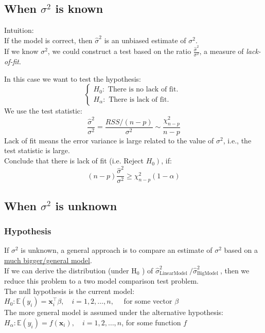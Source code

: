 \documentclass[11pt,a4paper]{article}
\begin{document}
\subsection{When $\sigma^2$ is known}
Intuition:\\
If the model is correct, then $\hat{\sigma}^2$ is an unbiased estimate of $\sigma^2$.\\
If we know $\sigma^2$, we could construct a test based on the ratio $\frac{\hat{\sigma}^2}{\sigma^2}$, a measure of \textit{lack-of-ﬁt}.

In this case we want to test the hypothesis:
$$
\left\{\begin{array}{l}
H_{0}: \text { There is no lack of fit. } \\
H_{\alpha}: \text { There is lack of fit. }
\end{array}\right.
$$
We use the test statistic:
$$
\frac{\hat{\sigma}^{2}}{\sigma^{2}}=\frac{R S S /(n-p)}{\sigma^{2}} \sim \frac{\chi_{n-p}^{2}}{n-p}
$$
Lack of fit means the error variance is large related to the value of $\sigma^{2}$, i.e., the test statistic is large.\\
Conclude that there is lack of fit (i.e. Reject $\left.H_{0}\right)$, if:
$$
(n-p) \frac{\hat{\sigma}^{2}}{\sigma^{2}} \geq \chi_{n-p}^{2}(1-\alpha)
$$

\subsection{When $\sigma^2$ is unknown}
\subsubsection{Hypothesis}
If $\sigma^{2}$ is unknown, a general approach is to compare an estimate of $\sigma^{2}$ based on a \underline{much bigger/general model}.\\
If we can derive the distribution (under $\mathrm{H}_{0}$ ) of $\hat{\sigma}_{\text {LinearModel }}^{2} / \hat{\sigma}_{\text {BigModel }}^{2}$, then we reduce this problem to a two model comparison test problem.\\
The null hypothesis is the current model:\\
$H_{0}: \mathbb{E}\left(y_{i}\right)=\mathbf{x}_{i}^{\top} \beta, \quad i=1,2, \ldots, n, \quad$ for some vector $\beta$\\
The more general model is assumed under the alternative hypothesis:\\
$H_{\alpha}: \mathbb{E}\left(y_{i}\right)=f\left(\mathbf{x}_{i}\right), \quad i=1,2, \ldots, n$, \quad for some function $f$\\
\end{document}
